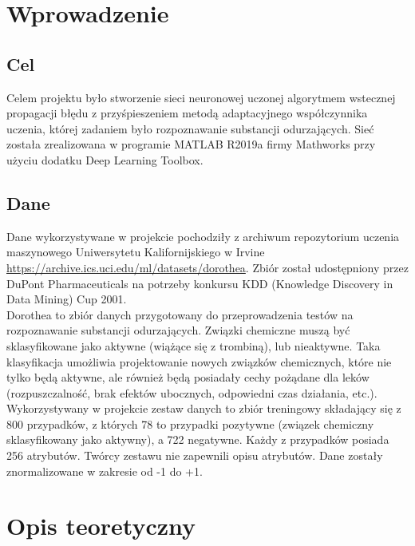 \documentclass[a4paper, openright, twoside,11pt]{article}
\begin{document}
    
    \newpage\null\thispagestyle{blank}\newpage
    \tableofcontents    
    \newpage\null\thispagestyle{blank}\newpage
    
    \newpage
    \setcounter{page}{1}
    
    \section{Wprowadzenie}
    \subsection{Cel}
    Celem projektu było stworzenie sieci neuronowej uczonej algorytmem wstecznej propagacji błędu z przyśpieszeniem metodą adaptacyjnego współczynnika uczenia, której zadaniem było rozpoznawanie substancji odurzających. Sieć została zrealizowana w programie MATLAB R2019a firmy Mathworks przy użyciu dodatku Deep Learning Toolbox.
    
    \subsection{Dane}
    Dane wykorzystywane w projekcie pochodziły z archiwum repozytorium uczenia maszynowego Uniwersytetu Kalifornijskiego w Irvine  \url{https://archive.ics.uci.edu/ml/datasets/dorothea}. Zbiór został udostępniony przez DuPont Pharmaceuticals na potrzeby konkursu KDD (Knowledge Discovery in Data Mining) Cup 2001.\\[0.5cm]
    Dorothea to zbiór danych przygotowany do przeprowadzenia testów na rozpoznawanie substancji odurzających. Związki chemiczne muszą być sklasyfikowane jako aktywne (wiążące się z trombiną), lub nieaktywne. Taka klasyfikacja umożliwia projektowanie nowych związków chemicznych, które nie tylko będą aktywne, ale również będą posiadały cechy pożądane dla leków (rozpuszczalność, brak efektów ubocznych, odpowiedni czas działania, etc.).\\[0.5cm]
    Wykorzystywany w projekcie zestaw danych to zbiór treningowy składający się z 800 przypadków, z których 78 to przypadki pozytywne (związek chemiczny sklasyfikowany jako aktywny), a 722 negatywne. Każdy z przypadków posiada 256 atrybutów. Twórcy zestawu nie zapewnili opisu atrybutów. Dane zostały znormalizowane w zakresie od -1 do +1.
    
    
    
    
    \clearpage
    \section{Opis teoretyczny}
\end{document}
